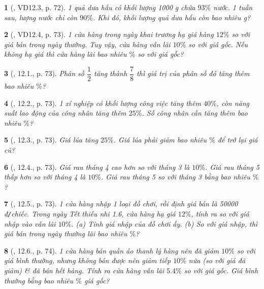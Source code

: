 \documentclass{article}
\newtheorem{baitoan}{}
\begin{document}
\begin{baitoan}[\cite{TLCT_THCS_Toan_6_so_hoc}, VD12.3, p. 72]
	1 quả dưa hấu có khối lượng {\rm1000 g} chứa $93\%$ nước. 1 tuần sau, lượng nước chỉ còn $90\%$. Khi đó, khối lượng quả dưa hấu còn bao nhiêu {\rm g}?
\end{baitoan}

\begin{baitoan}[\cite{TLCT_THCS_Toan_6_so_hoc}, VD12.4, p. 73]
	1 cửa hàng trong ngày khai trương hạ giá hàng $12\%$ so với giá bán trong ngày thường. Tuy vậy, cửa hàng vẫn lãi $10\%$ so với giá gốc. Nếu không hạ giá thì cửa hàng lãi bao nhiêu $\%$ so với giá gốc?
\end{baitoan}

\begin{baitoan}[\cite{TLCT_THCS_Toan_6_so_hoc}, 12.1., p. 73]
	Phân số $\dfrac{1}{2}$ tăng thành $\dfrac{7}{8}$ thì giá trị của phân số đó tăng thêm bao nhiêu $\%$?
\end{baitoan}

\begin{baitoan}[\cite{TLCT_THCS_Toan_6_so_hoc}, 12.2., p. 73]
	1 xí nghiệp có khối lượng công việc tăng thêm $40\%$, còn năng suất lao động của công nhân tăng thêm $25\%$. Số công nhân cần tăng thêm bao nhiêu $\%$?
\end{baitoan}

\begin{baitoan}[\cite{TLCT_THCS_Toan_6_so_hoc}, 12.3., p. 73]
	Giá lúa tăng $25\%$. Giá lúa phải giảm bao nhiêu $\%$ để trở lại giá cũ?
\end{baitoan}

\begin{baitoan}[\cite{TLCT_THCS_Toan_6_so_hoc}, 12.4., p. 73]
	Giá rau tháng 4 cao hơn so với tháng 3 là $10\%$. Giá rau tháng 5 thấp hơn so với tháng 4 là $10\%$. Giá rau tháng 5 so với tháng 3 bằng bao nhiêu $\%$?
\end{baitoan}

\begin{baitoan}[\cite{TLCT_THCS_Toan_6_so_hoc}, 12.5., p. 73]
	1 cửa hàng nhập 1 loại đồ chơi, rồi định giá bán là {\rm50000 đ{\tt/}chiếc}. Trong ngày Tết thiếu nhi 1.6, cửa hàng hạ giá $12\%$, tính ra so với giá nhập vào vẫn lãi $10\%$. (a) Tính giá nhập của đồ chơi ấy. (b) So với giá nhập, thì giá bán trong ngày thường lãi bao nhiêu $\%$?
\end{baitoan}

\begin{baitoan}[\cite{TLCT_THCS_Toan_6_so_hoc}, 12.6., p. 74]
	1 cửa hàng bán quần áo thanh lý hàng nên đã giảm $10\%$ so với giá bình thường, nhưng không bán được nên giảm tiếp $10\%$ nữa (so với giá đã giảm) \& đã bán hết hàng. Tính ra cửa hàng vẫn lãi $5.4\%$ so với giá gốc. Giá bình thường bằng bao nhiêu $\%$ giá gốc?
\end{baitoan}
\end{document}
